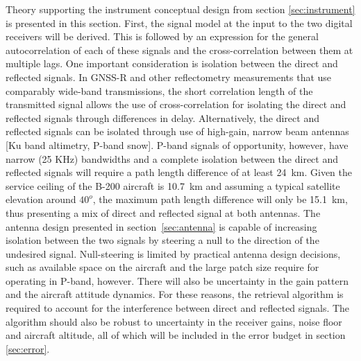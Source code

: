 \documentclass[draftcls,onecolumn]{IEEEtran}  %
\begin{document}
%
%
  Theory supporting the instrument conceptual design from section \ref{sec:instrument} is presented in this section. 
 First, the signal model at the input to the two digital receivers will be derived.
 This is followed by an expression for the general autocorrelation of each of these signals and the cross-correlation between them at multiple lags.  
 One important consideration is isolation between the direct and reflected signals.  
 In GNSS-R and other reflectometry measurements that use comparably wide-band transmissions, the short correlation length of the transmitted signal allows the use of cross-correlation for isolating the direct and reflected signals through  differences in delay. 
 Alternatively, the direct and reflected signals can be isolated through use of high-gain, narrow beam antennas [Ku band altimetry, P-band snow]. 
  P-band signals of opportunity, however, have narrow (25 KHz) bandwidths and a complete isolation between the direct and reflected signals will require a path length difference of at least 24~km. 
 Given the service ceiling of the B-200 aircraft is 10.7~km and assuming 
  a typical satellite elevation around $40^o$, the maximum path length difference will only be 15.1~km, thus presenting a mix of direct and reflected signal at both antennas. 
 The antenna design presented in section~\ref{sec:antenna} is capable of increasing isolation between the two signals by steering a null to the direction of the undesired signal. 
 Null-steering is limited by practical antenna design decisions, such as available space on the aircraft and the large patch size require for operating in P-band, however. 
 There will also be uncertainty in the gain pattern and the aircraft attitude dynamics.
 For these reasons, the retrieval algorithm is required to account for the interference between direct and reflected signals.  The algorithm should also be robust to uncertainty in the receiver gains, noise floor and aircraft altitude, all of which will be included in the error budget in section \ref{sec:error}.

 
 
\end{document}
